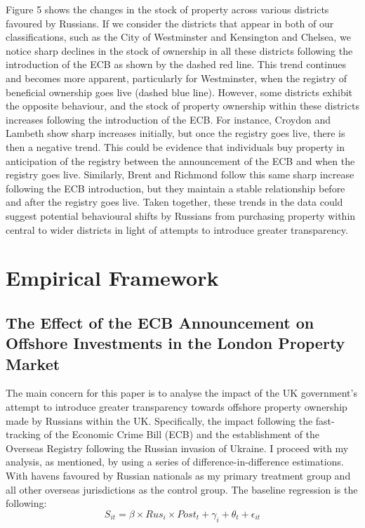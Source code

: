 \documentclass{article}
\begin{document}
Figure 5 shows the changes in the stock of property across various districts favoured by Russians. If we consider the districts that appear in both of our classifications, such as the City of Westminster and Kensington and Chelsea, we notice sharp declines in the stock of ownership in all these districts following the introduction of the ECB as shown by the dashed red line. This trend continues and becomes more apparent, particularly for Westminster, when the registry of beneficial ownership goes live (dashed blue line). However, some districts exhibit the opposite behaviour, and the stock of property ownership within these districts increases following the introduction of the ECB. For instance, Croydon and Lambeth show sharp increases initially, but once the registry goes live, there is then a negative trend. This could be evidence that individuals buy property in anticipation of the registry between the announcement of the ECB and when the registry goes live. Similarly, Brent and Richmond follow this same sharp increase following the ECB introduction, but they maintain a stable relationship before and after the registry goes live. Taken together, these trends in the data could suggest potential behavioural shifts by Russians from purchasing property within central to wider districts in light of attempts to introduce greater transparency.

\section{Empirical Framework}

\subsection{The Effect of the ECB Announcement on Offshore Investments in the London Property Market}

The main concern for this paper is to analyse the impact of the UK government's attempt to introduce greater transparency towards offshore property ownership made by Russians within the UK. Specifically, the impact following the fast-tracking of the Economic Crime Bill (ECB) and the establishment of the Overseas Registry following the Russian invasion of Ukraine. I proceed with my analysis, as mentioned, by using a series of difference-in-difference estimations. With havens favoured by Russian nationals as my primary treatment group and all other overseas jurisdictions as the control group. The baseline regression is the following:
\begin{equation}
S_{it} = \beta \times Rus_i \times Post_t + \gamma_i + \theta_t + \epsilon_{it}
\end{equation}
\end{document}
